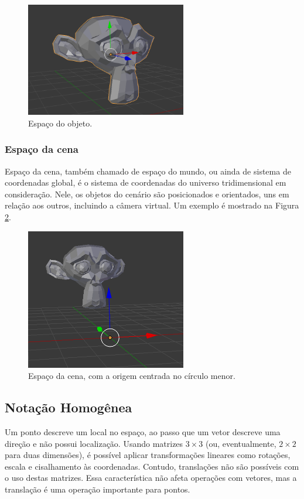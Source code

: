 \documentclass[12pt, a4paper, oneside]{book}
\begin{document}
\begin{figure}[!htb]
\center
\includegraphics[width=7cm]{objectSpace}
\caption{Espaço do objeto.}
\label{objectSpace}
\end{figure}

\subsubsection{Espaço da cena}
Espaço da cena, também chamado de espaço do mundo, ou ainda de sistema de coordenadas global, é o sistema de coordenadas do universo tridimensional em consideração. Nele, os objetos do cenário são posicionados e orientados, uns em relação aos outros, incluindo a câmera virtual. Um exemplo é mostrado na Figura \ref{worldSpace}.


\begin{figure}[!htb]
\center
\includegraphics[width=7cm]{worldSpace}
\caption{Espaço da cena, com a origem centrada no círculo menor.}
\label{worldSpace}
\end{figure}

\subsection{Notação Homogênea}

Um ponto descreve um local no espaço, ao passo que um vetor descreve uma direção e não possui localização. Usando matrizes $3 \times 3$ (ou, eventualmente, $2 \times 2$ para duas dimensões), é possível aplicar transformações lineares como rotações, escala e cisalhamento às coordenadas. Contudo, translações não são possíveis com o uso destas matrizes. Essa característica não afeta operações com vetores, mas a translação é uma operação importante para pontos.
\end{document}
